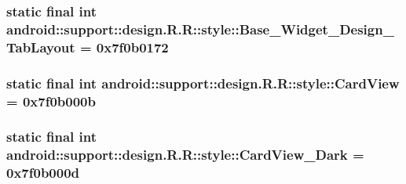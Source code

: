 \hypertarget{classandroid_1_1support_1_1design_1_1_r_1_1style_b0e0c742bfa05cbc4a1ff7a04bb5ab24}{
\subsubsection[{Base\_\-Widget\_\-Design\_\-TabLayout}]{\setlength{\rightskip}{0pt plus 5cm}static final int android::support::design.R.R::style::Base\_\-Widget\_\-Design\_\-TabLayout = 0x7f0b0172}}
\label{classandroid_1_1support_1_1design_1_1_r_1_1style_b0e0c742bfa05cbc4a1ff7a04bb5ab24}


\hypertarget{classandroid_1_1support_1_1design_1_1_r_1_1style_ecdbcbb00c5ba2b783e4595164666629}{
\subsubsection[{CardView}]{\setlength{\rightskip}{0pt plus 5cm}static final int android::support::design.R.R::style::CardView = 0x7f0b000b}}
\label{classandroid_1_1support_1_1design_1_1_r_1_1style_ecdbcbb00c5ba2b783e4595164666629}


\hypertarget{classandroid_1_1support_1_1design_1_1_r_1_1style_1628ec6e69e16e53c988bb8801e0ce29}{
\subsubsection[{CardView\_\-Dark}]{\setlength{\rightskip}{0pt plus 5cm}static final int android::support::design.R.R::style::CardView\_\-Dark = 0x7f0b000d}}
\label{classandroid_1_1support_1_1design_1_1_r_1_1style_1628ec6e69e16e53c988bb8801e0ce29}


